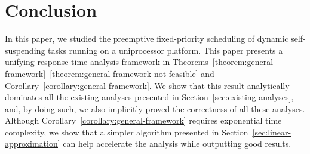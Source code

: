\documentclass[conference]{IEEEtran}
\begin{document}




























\section{Conclusion}
\label{sec:conclusion}


In this paper, we studied the preemptive fixed-priority scheduling of
dynamic self-suspending tasks running on a uniprocessor platform. This
paper presents a unifying response time analysis framework in
Theorems~\ref{theorem:general-framework}~\ref{theorem:general-framework-not-feasible} and
Corollary~\ref{corollary:general-framework}. We show that this result
analytically dominates all the existing analyses presented in
Section~\ref{sec:existing-analyses}, and, by doing such, we also implicitly
proved the correctness of all these analyses. Although
Corollary~\ref{corollary:general-framework} requires exponential time
complexity, we show that a simpler algorithm presented in Section~\ref{sec:linear-approximation} can help accelerate the analysis while outputting good results.

\end{document}
